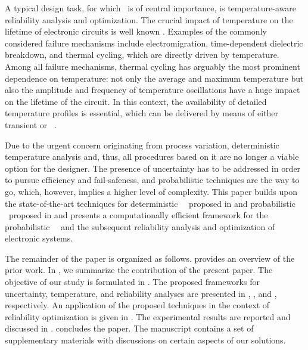 A typical design task, for which \ta\ is of central importance, is temperature-aware reliability analysis and optimization.
The crucial impact of temperature on the lifetime of electronic circuits is well known \cite{jedec}.
Examples of the commonly considered failure mechanisms include electromigration, time-dependent dielectric breakdown, and thermal cycling, which are directly driven by temperature.
Among all failure mechanisms, thermal cycling has arguably the most prominent dependence on temperature: not only the average and maximum temperature but also the amplitude and frequency of temperature oscillations have a huge impact on the lifetime of the circuit.
In this context, the availability of detailed temperature profiles is essential, which can be delivered by means of either transient or \DSS\ \ta.

Due to the urgent concern originating from process variation, deterministic temperature analysis and, thus, all procedures based on it are no longer a viable option for the designer.
The presence of uncertainty has to be addressed in order to pursue efficiency and fail-safeness, and probabilistic techniques are the way to go, which, however, implies a higher level of complexity.
This paper builds upon the state-of-the-art techniques for deterministic \DSS\ \ta\ proposed in \cite{ukhov2012} and probabilistic \tta\ proposed in \cite{ukhov2014} and presents a computationally efficient framework for the probabilistic \DSS\ \ta\ and the subsequent reliability analysis and optimization of electronic systems.

The remainder of the paper is organized as follows.
 provides an overview of the prior work.
In , we summarize the contribution of the present paper.
The objective of our study is formulated in .
The proposed frameworks for uncertainty, temperature, and reliability analyses are presented in , , and , respectively.
An application of the proposed techniques in the context of reliability optimization is given in .
The experimental results are reported and discussed in .
 concludes the paper.
The manuscript contains a set of supplementary materials with discussions on certain aspects of our solutions.
